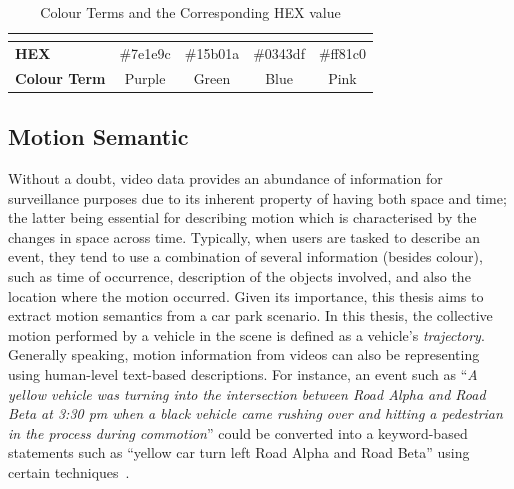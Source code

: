 \begin{table}[!ht]
\begin{tabular}{lcccc}
\multicolumn{1}{l|}{}                     & \multicolumn{1}{l|}{\cellcolor[HTML]{7E1E9C}} & \multicolumn{1}{l|}{\cellcolor[HTML]{15B01A}} & \multicolumn{1}{l|}{\cellcolor[HTML]{0343DF}} & \multicolumn{1}{l|}{\cellcolor[HTML]{FF81C0}} \\ \hline
\multicolumn{1}{|l|}{\textbf{HEX}}        & \multicolumn{1}{c|}{\#7e1e9c}                 & \multicolumn{1}{c|}{\#15b01a}                 & \multicolumn{1}{c|}{\#0343df}                 & \multicolumn{1}{c|}{\#ff81c0}                 \\ \hline
\multicolumn{1}{|l|}{\textbf{Colour Term}}  & \multicolumn{1}{c|}{Purple}                   & \multicolumn{1}{c|}{Green}                    & \multicolumn{1}{c|}{Blue}                     & \multicolumn{1}{c|}{Pink}                     \\ \hline
\end{tabular}
\caption{Colour Terms and the Corresponding HEX value}
\label{table:colorshex}
\end{table}



\subsection{Motion Semantic}

Without a doubt, video data provides an abundance of information for surveillance purposes due to its inherent property of having both space and time; the latter being essential for describing motion which is characterised by the changes in space across time.
Typically, when users are tasked to describe an event, they tend to use a combination of several information (besides colour), such as time of occurrence, description of the objects involved, and also the location where the motion occurred.
Given its importance, this thesis aims to extract motion semantics from a car park scenario.
In this thesis, the collective motion performed by a vehicle in the scene is defined as a vehicle's \emph{trajectory}.
Generally speaking, motion information from videos can also be representing using human-level text-based descriptions. For instance, an event such as ``\textit{A yellow vehicle was turning into the intersection between Road Alpha and Road Beta at 3:30 pm when a black vehicle came rushing over and hitting a pedestrian in the process during commotion}'' could be converted into a keyword-based statements such as ``yellow car turn left Road Alpha and Road Beta'' using certain techniques~\cite{feris2012large,momin2015vehicle,yang2015semantic}.

